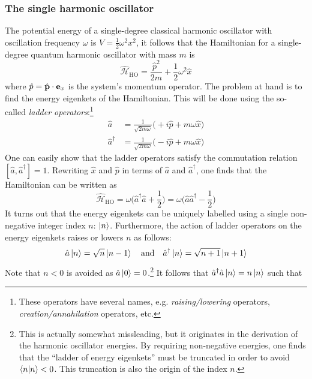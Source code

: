 \documentclass[nofootinbib,reprint,english]{revtex4-1}
\newcommand{\hatHH}{\hat{\mathcal{H}}}
\begin{document}
\subsubsection{The single harmonic oscillator}
The potential energy of a single-degree classical harmonic oscillator with oscillation frequency \(\omega\) is \(V=\frac{1}{2}\omega^2x^2\), it follows that the Hamiltonian for a single-degree quantum harmonic oscillator with mass \(m\) is
\begin{equation}\label{eq:Hamiltonian_harmonic_oscillator}
\hatHH_\text{HO}=\frac{\hat{p}^2}{2m}+\frac{1}{2}\omega^2\hat{x}
\end{equation}
where \(\hat{p}=\hat{\vb{p}}\cdot\vb{e}_x\) is the system's momentum operator. The problem at hand is to find the energy eigenkets of the Hamiltonian. This will be done using the so-called \emph{ladder operators}:\footnote{These operators have several names, e.g. \emph{raising/lowering} operators, \emph{creation/annahilation} operators, etc.}
\begin{subequations}\label{eq:harmonic_oscillator_ladder_operators}
\begin{align}
        \hat{a}&=\frac{1}{\sqrt{2m\omega}}\big(+i\hat{p}+m\omega\hat{x}\big)\\
\hat{a}^\dagger&=\frac{1}{\sqrt{2m\omega}}\big(-i\hat{p}+m\omega\hat{x}\big)
\end{align}
\end{subequations}
One can easily show that the ladder operators satisfy the commutation relation \([\hat{a},\hat{a}^\dagger]=1\). Rewriting \(\hat{x}\) and \(\hat{p}\) in terms of \(\hat{a}\) and \(\hat{a}^\dagger\), one finds that the Hamiltonian can be written as
\begin{equation}
\hatHH_\text{HO}=\omega\bigg(\hat{a}^\dagger\hat{a}+\frac{1}{2}\bigg)=\omega\bigg(\hat{a}\hat{a}^\dagger-\frac{1}{2}\bigg)
\end{equation}
It turns out that the energy eigenkets can be uniquely labelled using a single non-negative integer index \(n\): \(\ket{n}\). Furthermore, the action of ladder operators on the energy eigenkets raises or lowers \(n\) as follows:
\begin{equation}\label{eq:ladder_operations}
\hat{a}\ket{n}=\sqrt{n}\ket{n-1}\qand\hat{a}^\dagger\ket{n}=\sqrt{n+1}\ket{n+1}
\end{equation}
Note that \(n<0\) is avoided as \(\hat{a}\ket{0}=0\).\footnote{This is actually somewhat missleading, but it originates in the derivation of the harmonic oscillator energies. By requiring non-negative energies, one finds that the ``ladder of energy eigenkets'' must be truncated in order to avoid \(\braket{n}<0\). This truncation is also the origin of the index \(n\).} It follows that \(\hat{a}^\dagger\hat{a}\ket{n}=n\ket{n}\) such that
\end{document}
